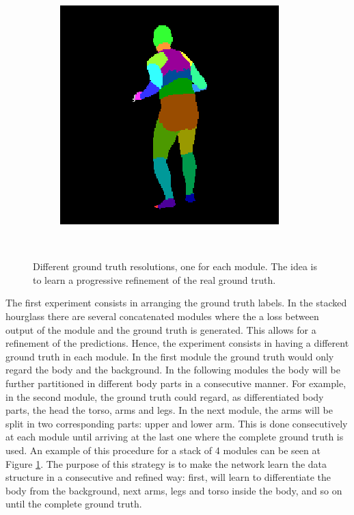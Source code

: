 \begin{figure}
\begin{subfigure}{.19\textwidth}
\end{subfigure}
\begin{subfigure}{.19\textwidth}
  \centering
  \includegraphics[scale=0.3]{02_05_c0005_segm_80_25c.png}\\
\end{subfigure}\\
\caption{Different ground truth resolutions, one for each module. The idea is to learn a progressive refinement of the real ground truth.}
\label{hourglass:diffgrounds}
\end{figure}

The first experiment consists in arranging the ground truth labels. In the stacked hourglass there are several concatenated modules where the a loss between output of the module and the ground truth is generated. This allows for a refinement of the predictions. Hence, the experiment consists in having a different ground truth in each module. In the first module the ground truth would only regard the body and the background. In the following modules the body will be further partitioned in different body parts in a consecutive manner. For example, in the second module, the ground truth could regard, as differentiated body parts, the head the torso, arms and legs. In the next module, the arms will be split in two corresponding parts: upper and lower arm. This is done consecutively at each module until arriving at the last one where the complete ground truth is used. An example of this procedure for a stack of 4 modules can be seen at Figure \ref{hourglass:diffgrounds}. The purpose of this strategy is to  make the network learn the data structure in a consecutive and refined way: first, will learn to differentiate the body from the background, next arms, legs and torso inside the body, and so on until the complete ground truth. \\



